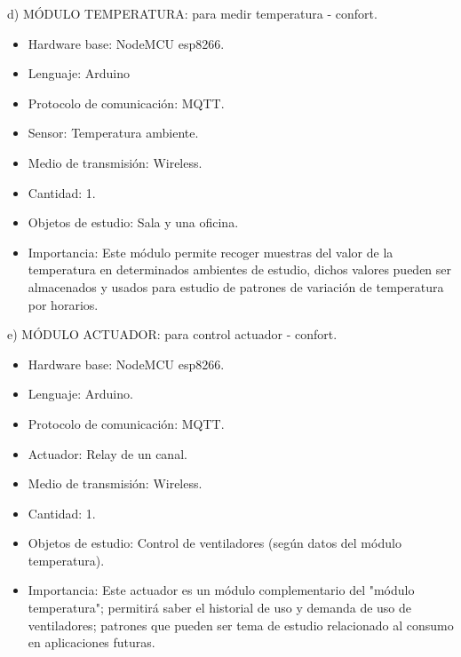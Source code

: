 \documentclass[11pt]{charter}
\begin{document}
d) MÓDULO TEMPERATURA: para medir temperatura - confort.
\begin{itemize}
\item Hardware base: NodeMCU esp8266.
\item Lenguaje: Arduino
\item Protocolo de comunicación: MQTT.
\item Sensor: Temperatura ambiente.
\item Medio de transmisión: Wireless.
\item Cantidad: 1.
\item Objetos de estudio: Sala y una oficina.
\item Importancia: Este módulo permite recoger muestras del valor de la temperatura en determinados ambientes de estudio, dichos valores pueden ser almacenados y usados para estudio de patrones de variación de temperatura por horarios.
\end{itemize}

e) MÓDULO ACTUADOR: para control actuador - confort.
\begin{itemize}
\item Hardware base: NodeMCU esp8266.
\item Lenguaje: Arduino.
\item Protocolo de comunicación: MQTT.
\item Actuador: Relay de un canal.
\item Medio de transmisión: Wireless.
\item Cantidad: 1.
\item Objetos de estudio: Control de ventiladores (según datos del módulo temperatura).
\item Importancia: Este actuador es un módulo complementario del "módulo temperatura"; permitirá saber el historial de uso y demanda de uso de ventiladores; patrones que pueden ser tema de estudio relacionado al consumo en aplicaciones futuras.
\end{itemize}
\end{document}
